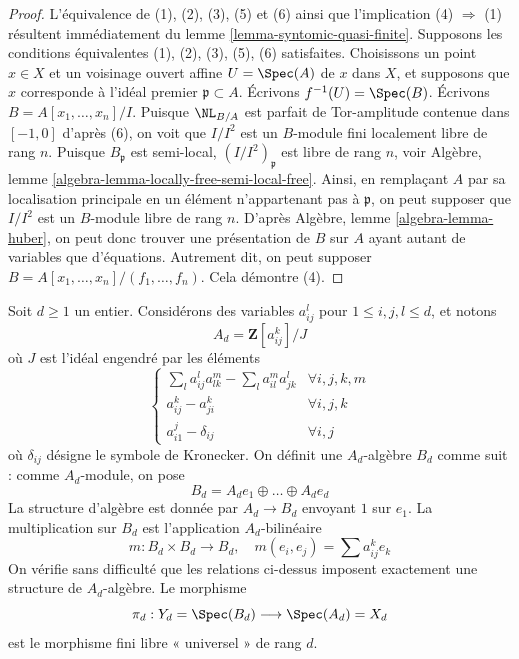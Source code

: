 \begin{proof}
L'équivalence de (1), (2), (3), (5) et (6)
ainsi que l'implication (4) $\Rightarrow$ (1) résultent immédiatement
du lemme \ref{lemma-syntomic-quasi-finite}. Supposons les conditions équivalentes
(1), (2), (3), (5), (6) satisfaites.
Choisissons un point $x \in X$ et un voisinage ouvert affine $U = \Spec(A)$
de $x$ dans $X$, et supposons que $x$ corresponde à l'idéal premier
$\mathfrak p \subset A$. Écrivons $f^{-1}(U) = \Spec(B)$.
Écrivons $B = A[x_1, \ldots, x_n]/I$. Puisque $\NL_{B/A}$
est parfait de Tor-amplitude contenue dans $[-1, 0]$ d'après (6),
on voit que $I/I^2$ est un $B$-module fini localement libre
de rang $n$. Puisque $B_\mathfrak p$ est semi-local,
$(I/I^2)_\mathfrak p$ est libre de rang $n$, voir
Algèbre, lemme \ref{algebra-lemma-locally-free-semi-local-free}.
Ainsi, en remplaçant $A$ par sa localisation principale en
un élément n'appartenant pas à $\mathfrak p$, on peut supposer que $I/I^2$
est un $B$-module libre de rang $n$.
D'après Algèbre, lemme \ref{algebra-lemma-huber},
on peut donc trouver une présentation de $B$ sur $A$
ayant autant de variables que d'équations. Autrement dit,
on peut supposer $B = A[x_1, \ldots, x_n]/(f_1, \ldots, f_n)$.
Cela démontre (4).
\end{proof}

\begin{example}
\label{example-universal-finite-syntomic}
Soit $d \geq 1$ un entier. Considérons des variables
$a_{ij}^l$ pour $1 \leq i, j, l \leq d$, et notons
$$
A_d = \mathbf{Z}[a_{ij}^k]/J
$$
où $J$ est l'idéal engendré par les éléments
$$
\left\{
\begin{matrix}
\sum_l a_{ij}^la_{lk}^m - \sum_l a_{il}^ma_{jk}^l & \forall i, j, k, m \\
a_{ij}^k - a_{ji}^k & \forall i, j, k \\
a_{i1}^j - \delta_{ij} & \forall i, j
\end{matrix}
\right.
$$
où $\delta_{ij}$ désigne le symbole de Kronecker.
On définit une $A_d$-algèbre $B_d$ comme suit : comme $A_d$-module, on pose
$$
B_d = A_d e_1 \oplus \ldots \oplus A_d e_d
$$
La structure d'algèbre est donnée par $A_d \to B_d$ envoyant $1$ sur $e_1$.
La multiplication sur $B_d$ est l'application $A_d$-bilinéaire
$$
m : B_d \times B_d \longrightarrow B_d, \quad
m(e_i, e_j) = \sum a_{ij}^k e_k
$$
On vérifie sans difficulté que les relations ci-dessus
imposent exactement une structure de $A_d$-algèbre.
Le morphisme
$$
\pi_d : Y_d = \Spec(B_d) \longrightarrow \Spec(A_d) = X_d
$$
est le morphisme fini libre « universel » de rang $d$.
\end{example}

